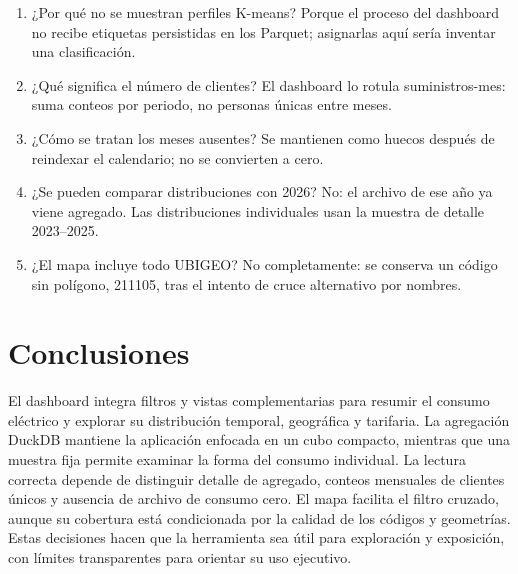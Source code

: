\documentclass[11pt,a4paper]{article}
\begin{document}
\begin{enumerate}
\item ¿Por qué no se muestran perfiles K-means? Porque el proceso del dashboard no recibe etiquetas persistidas en los Parquet; asignarlas aquí sería inventar una clasificación.
\item ¿Qué significa el número de clientes? El dashboard lo rotula suministros-mes: suma conteos por periodo, no personas únicas entre meses.
\item ¿Cómo se tratan los meses ausentes? Se mantienen como huecos después de reindexar el calendario; no se convierten a cero.
\item ¿Se pueden comparar distribuciones con 2026? No: el archivo de ese año ya viene agregado. Las distribuciones individuales usan la muestra de detalle 2023--2025.
\item ¿El mapa incluye todo UBIGEO? No completamente: se conserva un código sin polígono, 211105, tras el intento de cruce alternativo por nombres.
\end{enumerate}

\section{Conclusiones}
El dashboard integra filtros y vistas complementarias para resumir el consumo eléctrico y explorar su distribución temporal, geográfica y tarifaria. La agregación DuckDB mantiene la aplicación enfocada en un cubo compacto, mientras que una muestra fija permite examinar la forma del consumo individual. La lectura correcta depende de distinguir detalle de agregado, conteos mensuales de clientes únicos y ausencia de archivo de consumo cero. El mapa facilita el filtro cruzado, aunque su cobertura está condicionada por la calidad de los códigos y geometrías. Estas decisiones hacen que la herramienta sea útil para exploración y exposición, con límites transparentes para orientar su uso ejecutivo.
\end{document}
